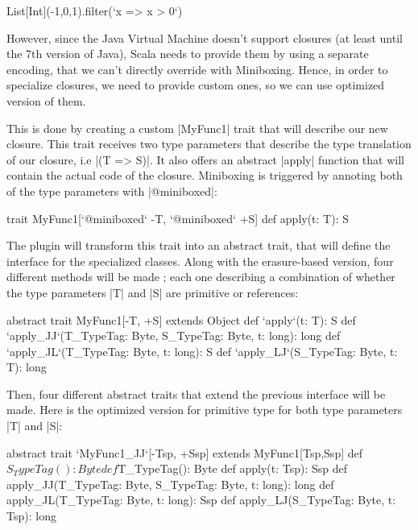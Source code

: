 \begin{lstlisting-nobreak}
 List[Int](-1,0,1).filter(`x => x > 0`)
\end{lstlisting-nobreak}

However, since the Java Virtual Machine doesn't support closures (at least until the 7th version of Java), Scala needs to provide them by using a separate encoding, that we can't directly override with Miniboxing. Hence, in order to specialize closures, we need to provide custom ones, so we can use optimized version of them.

This is done by creating a custom |MyFunc1| trait that will describe our new closure. This trait receives two type parameters that describe the type translation of our closure, i.e |(T => S)|. It also offers an abstract |apply| function that will contain the actual code of the closure. Miniboxing is triggered by annoting both of the type parameters with |@miniboxed|:

\begin{lstlisting-nobreak}
 trait MyFunc1[`@miniboxed` -T, `@miniboxed` +S] {
   def apply(t: T): S
 }
\end{lstlisting-nobreak}

The plugin will transform this trait into an abstract trait, that will define the interface for the specialized classes. Along with the erasure-based version, four different methods will be made ; each one describing a combination of whether the type parameters |T| and |S| are primitive or references:

\begin{lstlisting-nobreak}
  abstract trait MyFunc1[-T, +S] extends Object {
    def `apply`(t: T): S
    def `apply_JJ`(T_TypeTag: Byte,
        S_TypeTag: Byte, t: long): long
    def `apply_JL`(T_TypeTag: Byte, t: long): S
    def `apply_LJ`(S_TypeTag: Byte, t: T): long
  }
\end{lstlisting-nobreak}

Then, four different abstract traits that extend the previous interface will be made. Here is the optimized version for primitive type for both type parameters |T| and |S|:

\begin{lstlisting-nobreak}
  abstract trait `MyFunc1_JJ`[-Tsp, +Ssp] extends MyFunc1[Tsp,Ssp] {
    def $S_TypeTag(): Byte
    def $T_TypeTag(): Byte
    def apply(t: Tsp): Ssp
    def apply_JJ(T_TypeTag: Byte, S_TypeTag: Byte, t: long): long
    def apply_JL(T_TypeTag: Byte, t: long): Ssp
    def apply_LJ(S_TypeTag: Byte, t: Tsp): long
  }

\end{lstlisting-nobreak}

